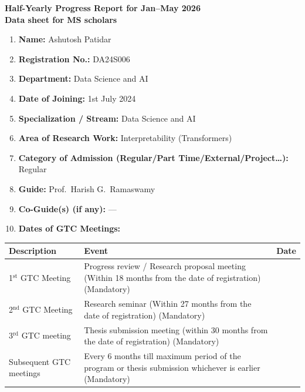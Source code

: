 \documentclass[12pt]{article}
\begin{document}
\begin{center}
{\large\bfseries Half-Yearly Progress Report for Jan--May 2026}\\[2pt]
{\bfseries Data sheet for MS scholars}
\end{center}

\begin{enumerate}[label=\arabic*.,leftmargin=2.2em]
\item \textbf{Name:} Ashutosh Patidar
\item \textbf{Registration No.:} DA24S006
\item \textbf{Department:} Data Science and AI
\item \textbf{Date of Joining:} 1st July 2024
\item \textbf{Specialization / Stream:} Data Science and AI
\item \textbf{Area of Research Work:} Interpretability (Transformers)
\item \textbf{Category of Admission (Regular/Part Time/External/Project\ldots):} Regular
\item \textbf{Guide:} Prof.\ Harish G.\ Ramaswamy
\item \textbf{Co-Guide(s) (if any):} ---
\item \textbf{Dates of GTC Meetings:}
\end{enumerate}

\begin{center}
\begin{tabular}{|p{3.4cm}|p{7.6cm}|p{2.4cm}|}
\hline
\textbf{Description} & \textbf{Event} & \textbf{Date}\\
\hline
1$^{\text{st}}$ GTC Meeting & Progress review / Research proposal meeting (Within 18 months from the date of registration) (Mandatory) & \\
\hline
2$^{\text{nd}}$ GTC Meeting & Research seminar (Within 27 months from the date of registration) (Mandatory) & \\
\hline
3$^{\text{rd}}$ GTC meeting & Thesis submission meeting (within 30 months from the date of registration) (Mandatory) & \\
\hline
Subsequent GTC meetings & Every 6 months till maximum period of the program or thesis submission whichever is earlier (Mandatory) & \\
\hline
\end{tabular}
\end{center}
\end{document}

